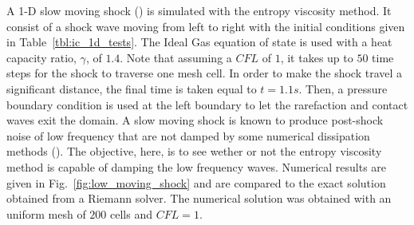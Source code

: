 \documentclass[preprint,10pt]{elsarticle}
\newcommand{\fig}[1]{Fig.~\ref{#1}}                      %
\newcommand{\tbl}[1]{Table~\ref{#1}}                     %
\begin{document}
A 1-D slow moving shock (\cite{james}) is simulated with the entropy viscosity method. It consist of a shock wave moving from left to right with the initial conditions given in \tbl{tbl:ic_1d_tests}. The Ideal Gas equation of state is used with a heat capacity ratio, $\gamma$, of $1.4$. Note that assuming a $CFL$ of $1$, it takes up to $50$ time steps for the shock to traverse one mesh cell. In order to make the shock travel a significant distance, the final time is taken equal to $t=1.1s$. Then, a pressure boundary condition is used at the left boundary to let the rarefaction and contact waves exit the domain.   
A slow moving shock is known to produce post-shock noise of low frequency that are not damped by some numerical dissipation methods (\cite{james}). The objective, here, is to see wether or not the entropy viscosity method is capable of damping the low frequency waves. Numerical results are given in \fig{fig:low_moving_shock} and are compared to the exact solution obtained from a Riemann solver. The numerical solution was obtained with an uniform mesh of $200$ cells and $CFL=1$.
%
\end{document}
